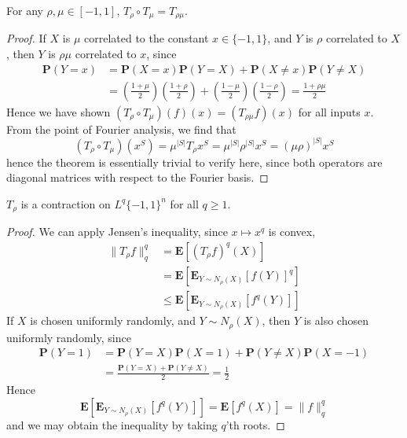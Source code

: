 \begin{theorem}
    For any $\rho, \mu \in [-1,1]$, $T_\rho \circ T_\mu = T_{\rho \mu}$.
\end{theorem}
\begin{proof}
    If $X$ is $\mu$ correlated to the constant $x \in \{ -1, 1 \}$, and $Y$ is $\rho$ correlated to $X$, then $Y$ is $\rho \mu$ correlated to $x$, since
    \begin{align*}
        \mathbf{P}(Y = x) &= \mathbf{P}(X = x) \mathbf{P}(Y = X) + \mathbf{P}(X \neq x) \mathbf{P}(Y \neq X)\\
        &= \left( \frac{1 + \mu}{2} \right) \left( \frac{1 + \rho}{2} \right) + \left( \frac{1 - \mu}{2} \right) \left( \frac{1 - \rho}{2} \right) = \frac{1 + \rho \mu}{2}
    \end{align*}
    Hence we have shown $(T_\rho \circ T_\mu)(f)(x) = (T_{\rho \mu} f)(x)$ for all inputs $x$. From the point of Fourier analysis, we find that
    \[ (T_\rho \circ T_\mu)(x^S) = \mu^{|S|} T_\rho x^S = \mu^{|S|} \rho^{|S|} x^S = (\mu \rho)^{|S|} x^S \]
    hence the theorem is essentially trivial to verify here, since both operators are diagonal matrices with respect to the Fourier basis.
\end{proof}

\begin{theorem}
    $T_\rho$ is a contraction on $L^q \{ -1,1 \}^n$ for all $q \geq 1$.
\end{theorem}
\begin{proof}
We can apply Jensen's inequality, since $x \mapsto x^q$ is convex,
%
\begin{align*}
    \| T_\rho f \|^q_q &= \mathbf{E}[(T_\rho f)^q(X)]\\
    &= \mathbf{E}[\mathbf{E}_{Y \sim N_\rho(X)}[f(Y)]^q]\\
    &\leq \mathbf{E}[\mathbf{E}_{Y \sim N_\rho(X)}[f^q(Y)]]
\end{align*}
%
If $X$ is chosen uniformly randomly, and $Y \sim N_\rho(X)$, then $Y$ is also chosen uniformly randomly, since
%
\begin{align*}
    \mathbf{P}(Y = 1) &= \mathbf{P}(Y = X) \mathbf{P}(X = 1) + \mathbf{P}(Y \neq X) \mathbf{P}(X = -1)\\
    &= \frac{\mathbf{P}(Y = X) + \mathbf{P}(Y \neq X)}{2} = \frac{1}{2}
\end{align*}
%
Hence
%
\[ \mathbf{E}[\mathbf{E}_{Y \sim N_\rho(X)}[f^q(Y)]] = \mathbf{E}[f^q(X)] = \| f \|_q^q \]
%
and we may obtain the inequality by taking $q$'th roots.
\end{proof}

